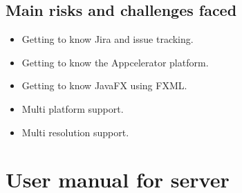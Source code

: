\documentclass[10pt,a4paper]{article}
\begin{document}
\subsection{Main risks and challenges faced}
\begin{itemize}
\item Getting to know Jira and issue tracking.
\item Getting to know the Appcelerator platform.
\item Getting to know JavaFX using FXML.
\item Multi platform support.
\item Multi resolution support.
\end{itemize}
\section{User manual for server}
\end{document}

